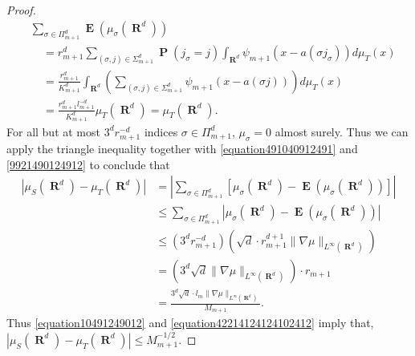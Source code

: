 \documentclass[12pt,reqno]{article}
\numberwithin{equation}{section}
\DeclareMathOperator{\RR}{\mathbf{R}}
\DeclareMathOperator{\EE}{\mathbf{E}}
\DeclareMathOperator{\PP}{\mathbf{P}}
\begin{document}
\begin{proof}
\begin{equation}
    \begin{split}
        &\sum\nolimits_{\sigma \in \Pi_{m+1}^d} \EE(\mu_\sigma(\RR^d))\\
        &\ \ \ \ \ = r_{m+1}^d \sum\nolimits_{(\sigma,j) \in \Sigma_{m+1}^d} \PP(j_\sigma = j) \int_{\RR^d} \psi_{m+1}(x - a(\sigma j_\sigma)) d\mu_T(x)\\
        &\ \ \ \ \ = \frac{r_{m+1}^d}{K_{m+1}^d} \int_{\RR^d} \left( \sum\nolimits_{(\sigma,j) \in \Sigma_{m+1}^d} \psi_{m+1}(x - a(\sigma j)) \right) d\mu_T(x)\\
        &\ \ \ \ \ = \frac{r_{m+1}^d l_{m+1}^{-d}}{K_{m+1}^d} \mu_T(\RR^d) = \mu_T(\RR^d).
    \end{split}
    \end{equation}
    For all but at most $3^d r_{m+1}^{-d}$ indices $\sigma \in \Pi_{m+1}^d$, $\mu_\sigma = 0$ almost surely. Thus we can apply the triangle inequality together with \eqref{equation491040912491} and \eqref{9921490124912} to conclude that
    \begin{equation} \label{equation42214124124102412}
    \begin{split}
        |\mu_S(\RR^d) - \mu_T(\RR^d)| &= \left| \sum\nolimits_{\sigma \in \Pi_{m+1}^d} \left[ \mu_\sigma(\RR^d) - \EE(\mu_\sigma(\RR^d)) \right] \right| \\
        &\leq \sum\nolimits_{\sigma \in \Pi_{m+1}^d} \left| \mu_\sigma(\RR^d) - \EE(\mu_\sigma(\RR^d)) \right|\\
        &\leq (3^d r_{m+1}^{-d}) \left( \sqrt{d} \cdot r_{m+1}^{d+1} \| \nabla \mu \|_{L^\infty(\RR^d)} \right)\\
        &= \left( 3^d \sqrt{d} \| \nabla \mu \|_{L^\infty(\RR^d)} \right) \cdot r_{m+1}\\
        &= \frac{3^d \sqrt{d} \cdot l_m \| \nabla \mu \|_{L^\infty(\RR^d)}}{M_{m+1}}.
    \end{split}
    \end{equation}  
    Thus \eqref{equation10491249012} and \eqref{equation42214124124102412} imply that, $|\mu_S(\RR^d) - \mu_T(\RR^d)| \leq M_{m+1}^{-1/2}$.
\end{proof}
\end{document}
